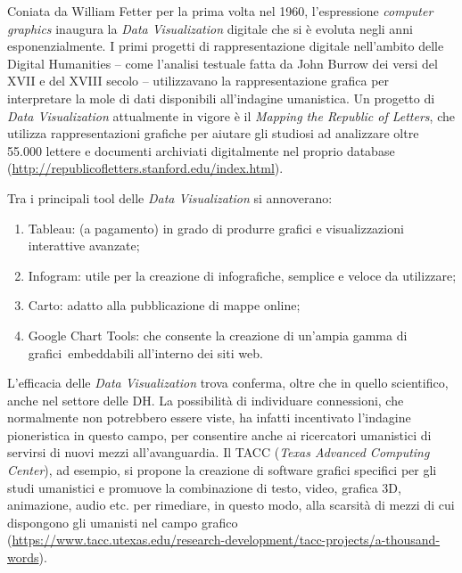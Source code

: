 \documentclass[
  b5paper,
  twoside,
  11pt,
  chapterprefix=false,
  bibliography=totocnumbered,
  listof=flat]{scrbook}
\begin{document}
Coniata da William Fetter per la prima volta nel 1960, l'espressione
\emph{computer} \emph{graphics} inaugura la \emph{Data Visualization} digitale che si è
evoluta negli anni esponenzialmente. I primi progetti di
rappresentazione digitale nell'ambito delle Digital Humanities -- come
l'analisi testuale fatta da John Burrow dei versi del XVII e del XVIII
secolo -- utilizzavano la rappresentazione grafica per interpretare la
mole di dati disponibili all'indagine umanistica. Un progetto di \emph{Data
Visualization} attualmente in vigore è il \emph{Mapping the Republic of
Letters}, che utilizza rappresentazioni grafiche per aiutare gli
studiosi ad analizzare oltre 55.000 lettere e documenti archiviati
digitalmente nel proprio database
(\href{http://republicofletters.stanford.edu/index.html}{{http://republicofletters.stanford.edu/index.html}}).

Tra i principali tool delle \emph{Data Visualization} si annoverano:

\begin{enumerate}
\def\labelenumi{\arabic{enumi}.}
\item
  Tableau: (a pagamento) in grado di produrre grafici e
  visualizzazioni interattive avanzate;
\item
  Infogram: utile per la creazione di infografiche, semplice e veloce
  da utilizzare;
\item
  Carto: adatto alla pubblicazione di mappe online;
\item
  Google Chart Tools: che consente la creazione di un'ampia gamma di
  grafici~embeddabili all'interno dei siti web.
\end{enumerate}

L'efficacia delle \emph{Data Visualization} trova conferma, oltre che in
quello scientifico, anche nel settore delle DH. La possibilità di
individuare connessioni, che normalmente non potrebbero essere viste, ha
infatti incentivato l'indagine pioneristica in questo campo, per
consentire anche ai ricercatori umanistici di servirsi di nuovi mezzi
all'avanguardia. Il TACC (\emph{Texas Advanced Computing Center}), ad
esempio, si propone la creazione di software grafici specifici per gli
studi umanistici e promuove la combinazione di testo, video, grafica 3D,
animazione, audio etc. per rimediare, in questo modo, alla scarsità di
mezzi di cui dispongono gli umanisti nel campo grafico
(\href{https://www.tacc.utexas.edu/research-development/tacc-projects/a-thousand-words}{{https://www.tacc.utexas.edu/research-development/tacc-projects/a-thousand-words}}).
\end{document}
